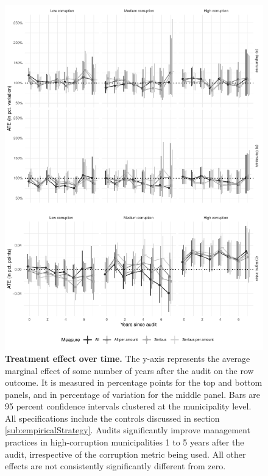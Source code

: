 \documentclass[12pt,a4paper]{article}
\theoremstyle{definition}
\begin{document}
\begin{figure}[H]
    \centering
    \includegraphics{figures/AMEoverTime}
    \caption{{\bf Treatment effect over time.} The y-axis represents the average marginal effect of some number of years after the audit on the row outcome. It is measured in percentage points for the top and bottom panels, and in percentage of variation for the middle panel. Bars are 95 percent confidence intervals clustered at the municipality level. All specifications include the controls discussed in section \ref{sub:empiricalStrategy}. Audits significantly improve management practices in high-corruption municipalities 1 to 5 years after the audit, irrespective of the corruption metric being used. All other effects are not consistently significantly different from zero.}
    \label{fig:AMEoverTime}
\end{figure}
\end{document}
